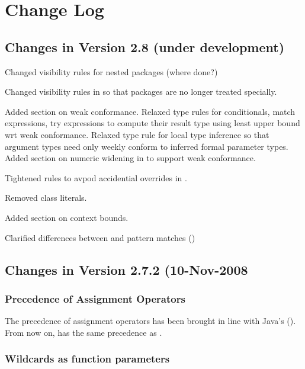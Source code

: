 
\chapter{Change Log}

\section*{Changes in Version 2.8 (under development)}

Changed visibility rules for nested packages (where done?)

Changed visibility rules in  so that packages are no
longer treated specially.

Added section  on weak conformance. Relaxed
type rules for conditionals, match expressions, try expressions to
compute their result type using least upper bound wrt weak
conformance. Relaxed type rule for local type inference so that
argument types need only weekly conform to inferred formal parameter
types. Added section on numeric widening in  to
support weak conformance.

Tightened rules to avpod accidential overrides in
.

Removed class literals.

Added section  on context bounds.

Clarified differences between  and pattern matches ()


\section*{Changes in Version 2.7.2 (10-Nov-2008}

\subsection*{Precedence of Assignment Operators}

The precedence of assignment operators has been brought in line with Java's 
().
From now on, \code{+=} has the same precedence as \code{=}.

\subsection*{Wildcards as function parameters}

